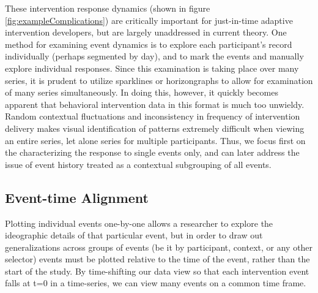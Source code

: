 These intervention response dynamics (shown in figure \ref{fig:exampleComplications}) are critically important for just-in-time adaptive intervention developers, but are largely unaddressed in current theory.
One method for examining event dynamics is to explore each participant's record individually (perhaps segmented by day), and to mark the events and manually explore individual responses.
Since this examination is taking place over many series, it is prudent to utilize sparklines \cite{tufte2006} or horizongraphs \cite{reijner2008} to allow for examination of many series simultaneously.
In doing this, however, it quickly becomes apparent that behavioral intervention data in this format is much too unwieldy.
Random contextual fluctuations and inconsistency in frequency of intervention delivery makes visual identification of patterns extremely difficult when viewing an entire series, let alone series for multiple participants.
Thus, we focus first on the characterizing the response to single events only, and can later address the issue of event history treated as a contextual subgrouping of all events.

\subsection{Event-time Alignment}
Plotting individual events one-by-one allows a researcher to explore the ideographic details of that particular event, but in order to draw out generalizations across groups of events (be it by participant, context, or any other selector) events must be plotted relative to the time of the event, rather than the start of the study.
By time-shifting our data view so that each intervention event falls at t=0 in a time-series, we can view many events on a common time frame.

